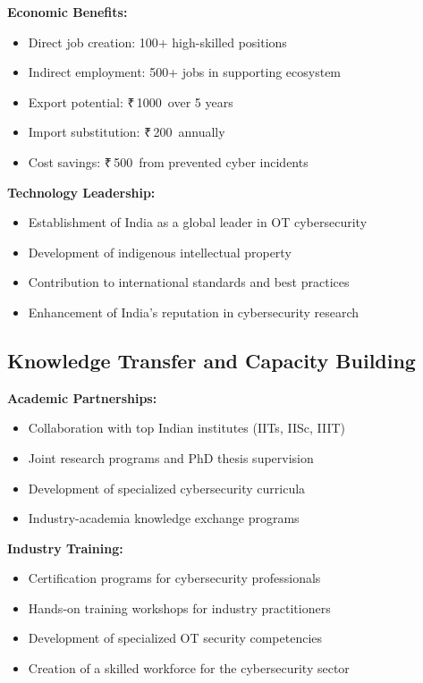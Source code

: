 \documentclass[12pt,a4paper]{article}
\newcommand{\rupees}{₹\,}
\newcommand{\crores}{\text{ Crores}}
\begin{document}
\textbf{Economic Benefits:}
\begin{itemize}
    \item Direct job creation: 100+ high-skilled positions
    \item Indirect employment: 500+ jobs in supporting ecosystem
    \item Export potential: \rupees 1000\crores\ over 5 years
    \item Import substitution: \rupees 200\crores\ annually
    \item Cost savings: \rupees 500\crores\ from prevented cyber incidents
\end{itemize}

\textbf{Technology Leadership:}
\begin{itemize}
    \item Establishment of India as a global leader in OT cybersecurity
    \item Development of indigenous intellectual property
    \item Contribution to international standards and best practices
    \item Enhancement of India's reputation in cybersecurity research
\end{itemize}

\subsection{Knowledge Transfer and Capacity Building}

\textbf{Academic Partnerships:}
\begin{itemize}
    \item Collaboration with top Indian institutes (IITs, IISc, IIIT)
    \item Joint research programs and PhD thesis supervision
    \item Development of specialized cybersecurity curricula
    \item Industry-academia knowledge exchange programs
\end{itemize}

\textbf{Industry Training:}
\begin{itemize}
    \item Certification programs for cybersecurity professionals
    \item Hands-on training workshops for industry practitioners
    \item Development of specialized OT security competencies
    \item Creation of a skilled workforce for the cybersecurity sector
\end{itemize}
\end{document}
